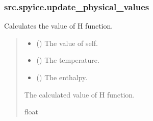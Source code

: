 \documentclass[a4paper,11pt,english,openany]{sphinxmanual}
\begin{document}
\sphinxstepscope


\subsubsection{src.spyice.update\_physical\_values}
\label{\detokenize{api/spyice.update_physical_values:module-src.spyice.update_physical_values}}\label{\detokenize{api/spyice.update_physical_values:src-spyice-update-physical-values}}\label{\detokenize{api/spyice.update_physical_values::doc}}

\begin{fulllineitems}
\label{\detokenize{api/spyice.update_physical_values:src.spyice.update_physical_values.H_function}}
\pysigstartsignatures
\pysiglinewithargsret
{}
{\sphinxparamcomma {}\sphinxparamcomma {}}
{}
\pysigstopsignatures
\sphinxAtStartPar
Calculates the value of H function.
\begin{quote}\begin{description}
\begin{itemize}
\item {} 
\sphinxAtStartPar
{} () \textendash{} The value of self.

\item {} 
\sphinxAtStartPar
{} () \textendash{} The temperature.

\item {} 
\sphinxAtStartPar
{} () \textendash{} The enthalpy.

\end{itemize}

\sphinxAtStartPar
The calculated value of H function.

\sphinxAtStartPar
float

\end{description}\end{quote}

\end{fulllineitems}
\end{document}
